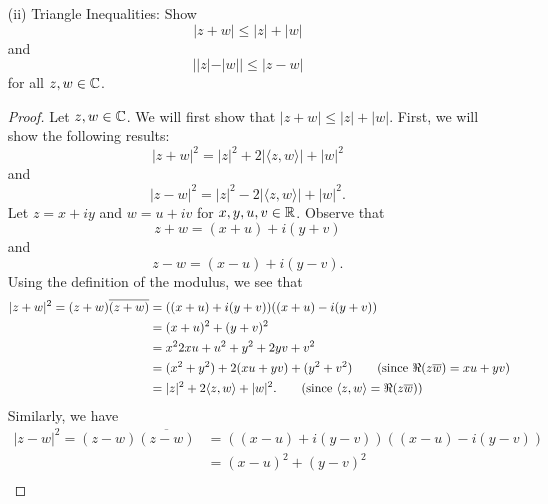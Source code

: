 \documentclass[a4paper]{article}
\begin{document}
\begin{enumerate}
\begin{proof}
    \begin{align*}
       | \langle z , w \rangle |^{2}   &\leq | \langle z , w \rangle |^{2} + | \langle iz , w \rangle |^{2}  
                                       = | z |^{2} | w |^{2} 
    \end{align*}
    and we are done.
                \end{proof}
            \item[(ii)] Triangle Inequalities: Show 
                \[  | z + w  | \leq | z  |  + | w  | \]
                and 
                \[  | | z  |  - | w |  | \leq | z - w  |  \]
                for all \( z,w \in \mathbb{C}  \).
                \begin{proof}
                Let \( z,w \in \mathbb{C}  \). We will first show that \(  | z + w  | \leq | z  |  + | w |  \). First, we will show the following results:
                \[  | z + w  |^{2} = | z |^{2} + 2 | \langle z , w \rangle | + | w |^{2} \tag{1} \]
                and 
                \[  | z - w  |^{2} = | z |^{2} - 2 | \langle z , w \rangle | + | w |^{2}. \tag{2}  \]
                Let \( z = x + iy \) and \( w = u + i v  \) for \( x,y,u,v \in \mathbb{R}  \). Observe that   
                \[  z + w = (x+u) + i(y +v) \]
                and 
                \[  z - w = (x-u) + i(y - v). \]
                Using the definition of the modulus, we see that
                \begin{align*}
                    | z + w  |^{2} = (z+w) \overline{(z+w)} &= ((x+u) + i(y+v)) ((x+u) - i(y+v)) \\
                                                            &= (x+u)^{2} + (y +v)^{2} \\
                                                            &= x^{2} 2xu + u^{2} + y^{2} + 2yv + v^{2} \\
                                                            &= (x^{2} + y^{2}) + 2 (xu + yv) + (y^{2} + v^{2}) \tag{since \( \Re(z \overline{w}) = xu + yv \)} \\
                                                            &= | z |^{2} + 2 \langle z , w \rangle + | w |^{2}. \tag{since \( \langle z , w \rangle = \Re(z \overline{w}) \)}
                \end{align*} 
                Similarly, we have
                \begin{align*}
                    | z - w  |^{2} = (z-w)\overline{(z-w)} &= ((x-u) + i (y - v)) ((x-u) - i (y - v)) \\
                                                           &= (x-u)^{2} + (y - v)^{2} \\

\end{align*}
\end{proof}
\end{enumerate}
\end{document}
